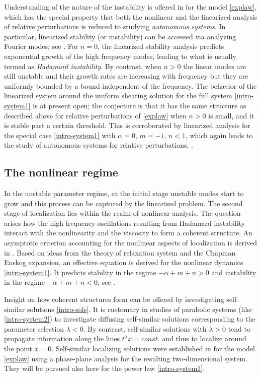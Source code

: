 \documentclass[11pt]{article}
\newcommand{\tcb}{}
\theoremstyle{remark}
\begin{document}
Understanding of the nature of the instability is offered in \cite{KOT14} for the model \eqref{explaw}, which has the special property
that both the nonlinear and the linearized analysis of relative perturbations is reduced to studying {\it autonomous systems}.
In particular, linearized stability (or instability) can be accessed  via analyzing Fourier modes; see \cite{KOT14}.
For $n=0$, the linearized stability analysis predicts  exponential growth of the high frequency modes, leading to what is usually termed as {\it Hadamard instability}.
By contrast, when $n > 0$ the linear modes are still unstable and their growth rates are increasing with frequency but they are
uniformly bounded by a bound independent of the frequency.  The behavior of the linearized system around the uniform shearing solution
for the full system \eqref{intro-system1} is at present open;  the conjecture is that it has the same structure as described above for relative perturbations of \eqref{explaw} when $n>0$ is small,
and it is stable past a certain threshold.
This is corroborated by linearized analysis for the special case \eqref{intro-system1} with $\alpha =0$, $m =-1$, $n <1$, which again
leads to the study of autonomous systems for relative perturbations, \cite{KLT_2016}.



\subsection{The nonlinear regime}

\tcb{ In the unstable parameter regime,
at the initial stage unstable modes start to grow and this process can be captured by the linearized problem.}
The second stage of localization lies within the realm of nonlinear analysis. The  question arises
 how the high frequency oscillations resulting from Hadamard instability interact with
the nonlinearity and the viscosity to form a coherent structure.
An asymptotic criterion accounting for the nonlinear aspects of localization is derived in \cite{KT09}.
Based on ideas from the theory of relaxation system and the Chapman Enskog expansion,  an effective equation is derived for the nonlinear dynamics \eqref{intro-system1}.
It predicts stability in the regime $- \alpha + m + n > 0$ and instability in the regime $-\alpha + m + n < 0$, see \cite{KT09}.


Insight on how coherent structures form can be offered by investigating self-similar solutions \eqref{intro-sols}.
It is customary in studies of parabolic systems (like \eqref{intro-system2}) to investigate diffusing self-similar
solutions corresponding to the parameter selection $\lambda < 0$. By contrast, self-similar solutions with  $\lambda > 0$ tend to propagate information
along the lines $t^\lambda x = const.$ and thus to localize around the point $x=0$.
Self-similar localizing solutions were established in \cite{KOT14}  for the model \eqref{explaw}  using a phase-plane analysis for the resulting two-dimensional
system. They will be pursued also here for the power law
 \eqref{intro-system1}.
\end{document}
